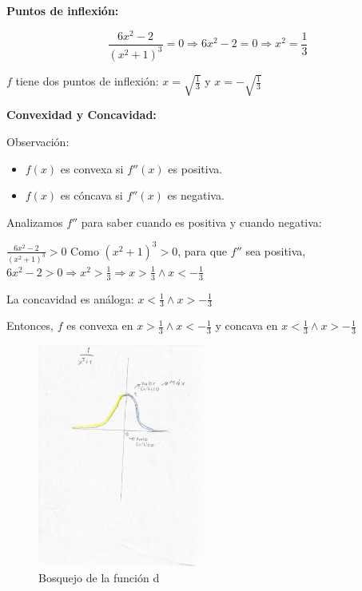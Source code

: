 \documentclass[12pt]{article}
\begin{document}
\begin{enumerate}[\hspace{9px} a)]
        \textbf{Puntos de inflexi\'on:}

        \[\displaystyle\frac{6x^2-2}{(x^2+1)^3}=0 \Rightarrow 6x^2-2=0 \Rightarrow x^2=\frac{1}{3}\]

        $f$ tiene dos puntos de inflexi\'on: $x=\displaystyle\sqrt{\frac{1}{3}}$ y $x=\displaystyle-\sqrt{\frac{1}{3}}$ \medskip

        \textbf{Convexidad y Concavidad:}\medskip

        Observaci\'on: 
        \begin{itemize}
            \item $f(x)$ es convexa si $f''(x)$ es positiva.
            \item $f(x)$ es c\'oncava si $f''(x)$ es negativa.
        \end{itemize}

        Analizamos $f''$ para saber cuando es positiva y cuando negativa:\medskip
        
        \(\displaystyle\frac{6x^2-2}{(x^2+1)^3} > 0\) \quad Como $(x^2+1)^3>0$, para que $f''$ sea positiva, \(6x^2-2>0 \Rightarrow x^2>\displaystyle\frac{1}{3} \Rightarrow x>\frac{1}{3} \wedge x<-\frac{1}{3}\)\medskip

        La concavidad es an\'aloga: \(x<\frac{1}{3} \wedge x>-\frac{1}{3}\)

        Entonces, $f$ es convexa en \(x>\frac{1}{3} \wedge x<-\frac{1}{3}\) y concava en \(x<\frac{1}{3} \wedge x>-\frac{1}{3}\)

        \begin{figure}[ht]
            \centering
            \includegraphics[width=0.5\textwidth]{16-d}
            \caption{Bosquejo de la funci\'on d}
        \end{figure}

\end{enumerate}
\end{document}
